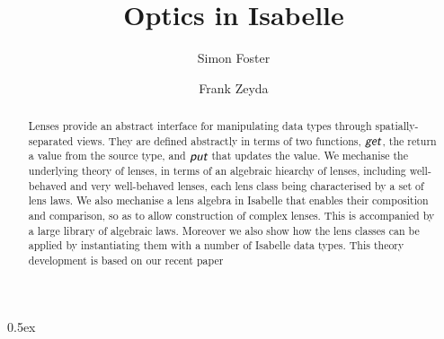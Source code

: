 \documentclass[11pt,a4paper]{article}
\newcommand{\lput}{\textit{\textsf{put}}}
\newcommand{\lget}{\textit{\textsf{get}}}
\begin{document}
\title{Optics in Isabelle}

\author{Simon Foster \and Frank Zeyda}

\maketitle

\begin{abstract}
  Lenses provide an abstract interface for manipulating data types through spatially-separated views. They are defined
  abstractly in terms of two functions, $\lget$, the return a value from the source type, and $\lput$ that updates
  the value. We mechanise the underlying theory of lenses, in terms of an algebraic hiearchy of lenses, including
  well-behaved and very well-behaved lenses, each lens class being characterised by a set of lens laws. We also mechanise 
  a lens algebra in Isabelle that enables their composition and comparison, so as to allow construction of complex lenses.
  This is accompanied by a large library of algebraic laws. Moreover we also show how the lens classes can be applied by 
  instantiating them with a number of Isabelle data types. This theory development is based on our recent paper~\cite{Foster16a}
\end{abstract}

\tableofcontents

\parindent 0pt\parskip 0.5ex





\end{document}
